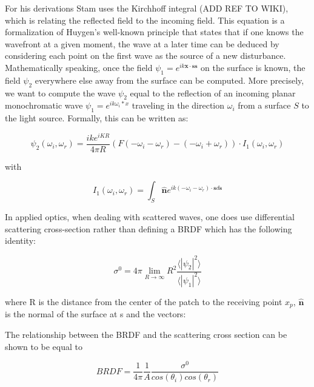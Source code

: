 For his derivations Stam uses the Kirchhoff integral (ADD REF TO WIKI), which is relating the reflected field to the incoming field. This equation is a formalization of Huygen’s well-known principle that states that if one knows the wavefront at a given moment, the wave at a later time can be deduced by considering each point on the first wave as the source of a new disturbance. Mathematically speaking, once the field  $\psi_1 =  e^{ik\mathbf{x} \cdot \mathbf{s}\mathbf{s}}$ on the surface is known, the field $\psi_2$ everywhere else away from the surface can be computed.
More precisely, we want to compute the wave $\psi_2$ equal to the reflection of an incoming planar monochromatic wave $\psi_1 = e^{ik \omega_i * x}$  traveling in the direction $\omega_i$ from a surface $S$ to the light source. Formally, this can be written as:

\begin{equation}
\psi_{2}(\omega_i, \omega_r) = \frac{i k e^{i K R}}{4 \pi R} (F(-\omega_i-\omega_r)-(-\omega_i+\omega_r)) \cdot I_{1}(\omega_i, \omega_r) 
\label{eq:kirchhoff}
\end{equation}

with

\begin{equation}
I_{1}(\omega_i, \omega_r) = \int_{S} \hat{\mathbf{n}} e^{ik(-\omega_i-\omega_{r}) \cdot \mathbf{s} d\mathbf{s}}
\label{eq:IBase}
\end{equation}

In applied optics, when dealing with scattered waves, one does use differential scattering cross-section rather than defining a BRDF which has the following identity: 

\begin{equation}
    \sigma^0 = 4 \pi \lim_{R \to \infty} R^2 \frac{\langle \left|\psi_2\right|^2\rangle}{\langle \left|\psi_1\right|^2\rangle}
\end{equation}

where R is the distance from the center of the patch to the receiving point $x_p$, $\hat{\mathbf{n}}$ is the normal of the surface at s and the vectors:

The relationship between the BRDF and the scattering cross section can be shown to be equal to 

\begin{equation}
 BRDF = \frac{1}{4\pi}\frac{1}{A}\frac{\sigma^0}{cos(\theta_i)cos(\theta_r)}
 \label{fig:crossscateringbrdfrelationship} 
\end{equation}

